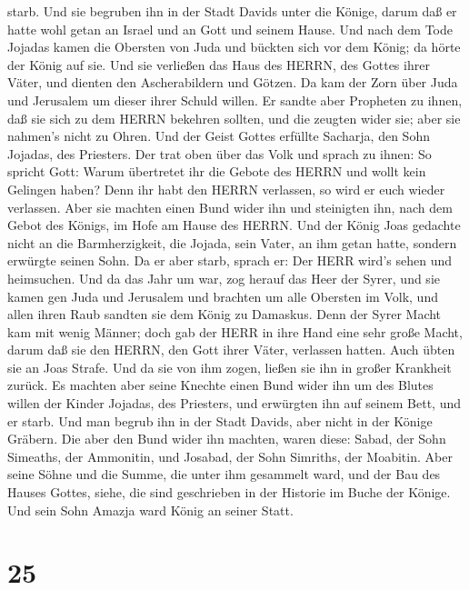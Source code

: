 starb.  Und sie begruben ihn in der Stadt Davids unter die
Könige, darum daß er hatte wohl getan an Israel und an Gott und seinem
Hause.  Und nach dem Tode Jojadas kamen die Obersten von
Juda und bückten sich vor dem König; da hörte der König auf sie.
 Und sie verließen das Haus des HERRN, des Gottes ihrer
Väter, und dienten den Ascherabildern und Götzen. Da kam der Zorn über
Juda und Jerusalem um dieser ihrer Schuld willen.  Er
sandte aber Propheten zu ihnen, daß sie sich zu dem HERRN bekehren
sollten, und die zeugten wider sie; aber sie nahmen's nicht zu Ohren.
 Und der Geist Gottes erfüllte Sacharja, den Sohn Jojadas,
des Priesters. Der trat oben über das Volk und sprach zu ihnen: So
spricht Gott: Warum übertretet ihr die Gebote des HERRN und wollt kein
Gelingen haben? Denn ihr habt den HERRN verlassen, so wird er euch
wieder verlassen.  Aber sie machten einen Bund wider ihn
und steinigten ihn, nach dem Gebot des Königs, im Hofe am Hause des
HERRN.  Und der König Joas gedachte nicht an die
Barmherzigkeit, die Jojada, sein Vater, an ihm getan hatte, sondern
erwürgte seinen Sohn. Da er aber starb, sprach er: Der HERR wird's sehen
und heimsuchen.  Und da das Jahr um war, zog herauf das
Heer der Syrer, und sie kamen gen Juda und Jerusalem und brachten um
alle Obersten im Volk, und allen ihren Raub sandten sie dem König zu
Damaskus.  Denn der Syrer Macht kam mit wenig Männer; doch
gab der HERR in ihre Hand eine sehr große Macht, darum daß sie den
HERRN, den Gott ihrer Väter, verlassen hatten. Auch übten sie an Joas
Strafe.  Und da sie von ihm zogen, ließen sie ihn in großer
Krankheit zurück. Es machten aber seine Knechte einen Bund wider ihn um
des Blutes willen der Kinder Jojadas, des Priesters, und erwürgten ihn
auf seinem Bett, und er starb. Und man begrub ihn in der Stadt Davids,
aber nicht in der Könige Gräbern.  Die aber den Bund wider
ihn machten, waren diese: Sabad, der Sohn Simeaths, der Ammonitin, und
Josabad, der Sohn Simriths, der Moabitin.  Aber seine Söhne
und die Summe, die unter ihm gesammelt ward, und der Bau des Hauses
Gottes, siehe, die sind geschrieben in der Historie im Buche der Könige.
Und sein Sohn Amazja ward König an seiner Statt.

\hypertarget{section-24}{%
\section{25}\label{section-24}}

